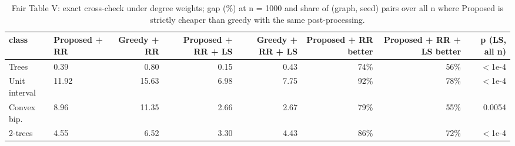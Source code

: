 \begin{table}[t]
\centering
\caption{Fair Table V: exact cross-check under degree weights; gap (\%) at n = 1000 and share of (graph, seed) pairs over all n where Proposed is strictly cheaper than greedy with the same post-processing.}
\label{tab:exact_fair_t5}
\scriptsize
\begin{tabular}{llrrrrrr}
\toprule
class & Proposed + RR & Greedy + RR & Proposed + RR + LS & Greedy + RR + LS & Proposed + RR better & Proposed + RR + LS better & p (LS, all n) \\
\midrule
Trees & 0.39 & 0.80 & 0.15 & 0.43 & 74\% & 56\% & $<$1e-4 \\
Unit interval & 11.92 & 15.63 & 6.98 & 7.75 & 92\% & 78\% & $<$1e-4 \\
Convex bip. & 8.96 & 11.35 & 2.66 & 2.67 & 79\% & 55\% & 0.0054 \\
2-trees & 4.55 & 6.52 & 3.30 & 4.43 & 86\% & 72\% & $<$1e-4 \\
\bottomrule
\end{tabular}
\end{table}
